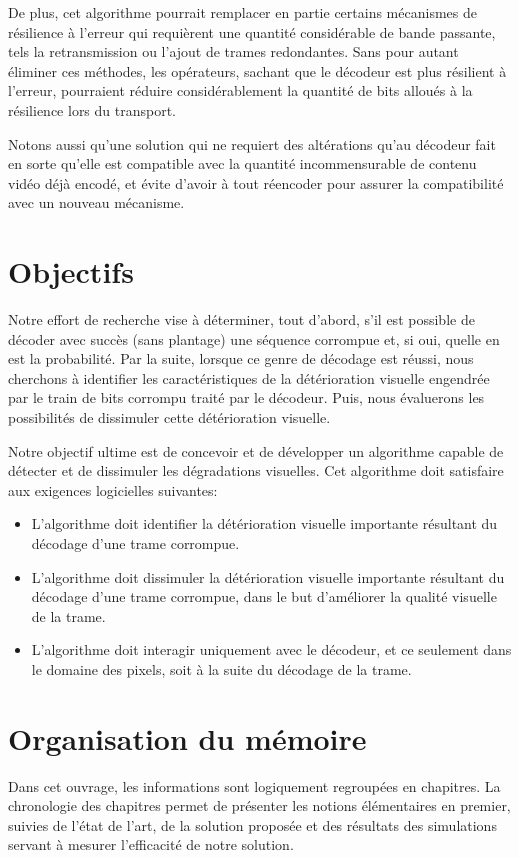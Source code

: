 De plus, cet algorithme pourrait remplacer en partie certains mécanismes de
résilience à l'erreur qui requièrent une quantité considérable de bande
passante, tels la retransmission ou l'ajout de trames redondantes. Sans pour
autant éliminer ces méthodes, les opérateurs, sachant que le décodeur est plus
résilient à l'erreur, pourraient réduire considérablement la quantité de bits
alloués à la résilience lors du transport.

Notons aussi qu'une solution qui ne requiert des altérations qu'au
décodeur fait en sorte qu'elle est compatible avec la quantité incommensurable
de contenu vidéo déjà encodé, et évite d'avoir à tout réencoder pour
assurer la compatibilité avec un nouveau mécanisme.

\section*{Objectifs}
Notre effort de recherche vise à déterminer, tout d'abord, s'il est possible de
décoder avec succès (sans plantage) une séquence corrompue et, si oui, quelle en
est la probabilité. Par la suite, lorsque ce genre de décodage est réussi, nous
cherchons à identifier les caractéristiques de la détérioration visuelle
engendrée par le train de bits corrompu traité par le décodeur. Puis, nous
évaluerons les possibilités de dissimuler cette détérioration visuelle.

Notre objectif ultime est de concevoir et de développer un algorithme capable de
détecter et de dissimuler les dégradations visuelles. Cet algorithme doit
satisfaire aux exigences logicielles suivantes:
\begin{itemize}
\item L'algorithme doit identifier la détérioration visuelle importante
résultant du décodage d'une trame corrompue.
\item L'algorithme doit dissimuler la détérioration visuelle importante
résultant du décodage d'une trame corrompue, dans le but d'améliorer la qualité
visuelle de la trame.
\item L'algorithme doit interagir uniquement avec le décodeur, et ce seulement
dans le domaine des pixels, soit à la suite du décodage de la trame.
\end{itemize}

\section*{Organisation du mémoire}
Dans cet ouvrage, les informations sont logiquement regroupées en chapitres. La
chronologie des chapitres permet de présenter les notions élémentaires en
premier, suivies de l'état de l'art, de la solution proposée et des résultats
des simulations servant à mesurer l'efficacité de notre solution.


